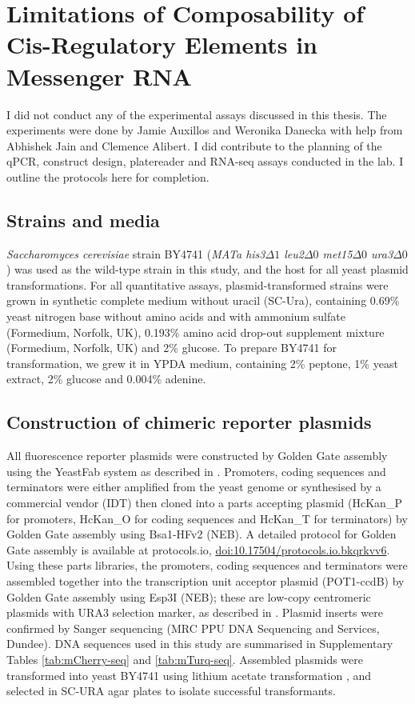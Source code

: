 \documentclass[../main.tex]{subfiles}
\begin{document}
\section{{Limitations} of Composability of Cis-Regulatory Elements in Messenger RNA}

I did not conduct any of the experimental assays discussed in this thesis. The experiments were done by Jamie Auxillos and Weronika Danecka with help from Abhishek Jain and Clemence Alibert. I did contribute to the planning of the qPCR, construct design, platereader and RNA-seq assays conducted in the lab. I outline the protocols here for completion.

\subsection{Strains and media}

\emph{Saccharomyces cerevisiae} strain BY4741 (\emph{MATa his3\(\Delta1\) leu2\(\Delta0\) met15\(\Delta0\) ura3\(\Delta0\)}) was used as the wild-type strain in this study, and the host for all yeast plasmid transformations.
For all quantitative assays, plasmid-transformed strains were grown in synthetic complete medium without uracil (SC-Ura), containing 0.69\% yeast nitrogen base without amino acids and with ammonium sulfate (Formedium, Norfolk, UK), 0.193\% amino acid drop-out supplement mixture (Formedium, Norfolk, UK) and 2\% glucose.
To prepare BY4741 for transformation, we grew it in YPDA medium, containing 2\% peptone, 1\% yeast extract, 2\% glucose and 0.004\% adenine.

\subsection{Construction of chimeric reporter plasmids}

All fluorescence reporter plasmids were constructed by Golden Gate assembly using the YeastFab system as described in \parencite{Garcia2018}.
Promoters, coding sequences and terminators were either amplified from the yeast genome or synthesised by a commercial vendor (IDT) then cloned into a parts accepting plasmid (HcKan\_P for promoters, HcKan\_O for coding sequences and HcKan\_T for terminators) by Golden Gate assembly using Bsa1-HFv2 (NEB).
A detailed protocol for Golden Gate assembly is available at protocols.io, \href{http://dx.doi.org/10.17504/protocols.io.bkqrkvv6}{doi:10.17504/protocols.io.bkqrkvv6}.
Using these parts libraries, the promoters, coding sequences and terminators were assembled together into the transcription unit acceptor plasmid (POT1-ccdB) by Golden Gate assembly using Esp3I (NEB); these are low-copy centromeric plasmids with URA3 selection marker, as described in \parencite{Garcia2018}.
Plasmid inserts were confirmed by Sanger sequencing (MRC PPU DNA Sequencing and Services, Dundee).
DNA sequences used in this study are summarised in Supplementary Tables \ref{tab:mCherry-seq} and \ref{tab:mTurq-seq}.
Assembled plasmids were transformed into yeast BY4741 using lithium acetate transformation \parencite{Gietz2002a}, and selected in SC-URA agar plates to isolate successful transformants.
\end{document}
